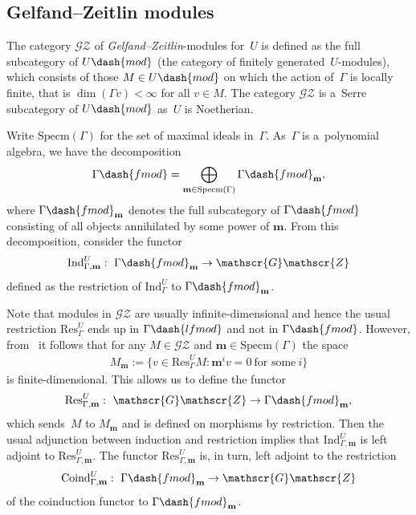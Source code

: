\documentclass[pdftex]{sigma}
\begin{document}
\subsection{Gelfand--Zeitlin modules}%

The category $\mathscr{G}\mathscr{Z}$ of {\em Gelfand--Zeitlin}-modules for~$U$ is def\/ined as the full subcategory of
$U\dash{mod}$ (the category of f\/initely generated~$U$-modules), which consists of those $M\in U\dash{mod}$ on which the
action of~$\Gamma$ is locally f\/inite, that is $\dim(\Gamma v)<\infty$ for all $v\in M$.
The category $\mathscr{G}\mathscr{Z}$ is a~Serre subcategory of $U\dash{mod}$ as~$U$ is Noetherian.

Write $\mathrm{Specm}(\Gamma)$ for the set of maximal ideals in~$\Gamma$.
As~$\Gamma$ is a~polynomial algebra, we have the decomposition
\begin{gather*}
\Gamma\dash{fmod}=\bigoplus_{\mathbf{m}\in\mathrm{Specm}(\Gamma)} \Gamma\dash{fmod}_{\mathbf{m}},
\end{gather*}
where $\Gamma\dash{fmod}_{\mathbf{m}}$ denotes the full subcategory of $\Gamma\dash{fmod}$ consisting of all objects
annihilated by some power of $\mathbf{m}$.
From this decomposition, consider the functor
\begin{gather*}
\mathrm{Ind}_{\Gamma,\mathbf{m}}^U: \ \Gamma\dash{fmod}_{\mathbf{m}}\to \mathscr{G}\mathscr{Z}
\end{gather*}
def\/ined as the restriction of $\mathrm{Ind}_{\Gamma}^U$ to $\Gamma\dash{fmod}_{\mathbf{m}}$.

Note that modules in $\mathscr{G}\mathscr{Z}$ are usually inf\/inite-dimensional and hence the usual restriction
$\mathrm{Res}_{\Gamma}^U$ ends up in $\Gamma\dash{lfmod}$ and not in $\Gamma\dash{fmod}$.
However, from~\cite[Corollary~5.3(a)]{FuOv2} it follows that for any $M\in \mathscr{G}\mathscr{Z}$ and
$\mathbf{m}\in\mathrm{Specm}(\Gamma)$ the space
\begin{gather*}
M_{\mathbf{m}}:=\big\{v\in \mathrm{Res}_{\Gamma}^U M: \mathbf{m}^iv=0~\text{for some}~i\big\}
\end{gather*}
is f\/inite-dimensional.
This allows us to def\/ine the functor
\begin{gather*}
\mathrm{Res}_{\Gamma,\mathbf{m}}^U: \ \mathscr{G}\mathscr{Z}\to \Gamma\dash{fmod}_{\mathbf{m}},
\end{gather*}
which sends~$M$ to $M_{\mathbf{m}}$ and is def\/ined on morphisms by restriction.
Then the usual adjunction between induction and restriction implies that $\mathrm{Ind}_{\Gamma,\mathbf{m}}^U$ is left
adjoint to $\mathrm{Res}_{\Gamma,\mathbf{m}}^U$.
The functor $\mathrm{Res}_{\Gamma,\mathbf{m}}^U$ is, in turn, left adjoint to the restriction
\begin{gather*}
\mathrm{Coind}_{\Gamma,\mathbf{m}}^U: \ \Gamma\dash{fmod}_{\mathbf{m}}\to \mathscr{G}\mathscr{Z}
\end{gather*}
of the coinduction functor to $\Gamma\dash{fmod}_{\mathbf{m}}$.
\end{document}
